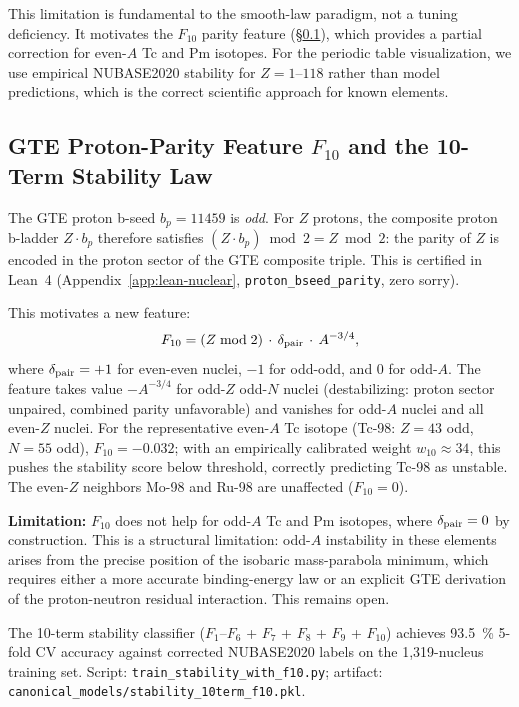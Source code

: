 \documentclass[9pt,twocolumn]{extarticle}
\begin{document}
This limitation is fundamental to the smooth-law paradigm, not a tuning deficiency. It motivates the $F_{10}$ parity feature (\S\ref{sec:f10-feature}), which provides a partial correction for even-$A$ Tc and Pm isotopes. For the periodic table visualization, we use empirical NUBASE2020 stability for $Z=1$--$118$ rather than model predictions, which is the correct scientific approach for known elements.

\subsection{GTE Proton-Parity Feature $F_{10}$ and the 10-Term Stability Law}
\label{sec:f10-feature}

The GTE proton b-seed $b_p = 11459$ is \emph{odd}. For $Z$ protons, the composite proton b-ladder $Z \cdot b_p$ therefore satisfies $(Z \cdot b_p)\bmod 2 = Z \bmod 2$: the parity of $Z$ is encoded in the proton sector of the GTE composite triple. This is certified in Lean~4 (Appendix~\ref{app:lean-nuclear}, \texttt{proton\_bseed\_parity}, zero sorry).

This motivates a new feature:
\begin{equation}
F_{10} = (Z \bmod 2)\,\cdot\,\delta_{\rm pair}\,\cdot\,A^{-3/4},
\end{equation}
where $\delta_{\rm pair} = +1$ for even-even nuclei, $-1$ for odd-odd, and $0$ for odd-$A$. The feature takes value $-A^{-3/4}$ for odd-$Z$ odd-$N$ nuclei (destabilizing: proton sector unpaired, combined parity unfavorable) and vanishes for odd-$A$ nuclei and all even-$Z$ nuclei. For the representative even-$A$ Tc isotope (Tc-98: $Z=43$ odd, $N=55$ odd), $F_{10} = -0.032$; with an empirically calibrated weight $w_{10} \approx 34$, this pushes the stability score below threshold, correctly predicting Tc-98 as unstable. The even-$Z$ neighbors Mo-98 and Ru-98 are unaffected ($F_{10}=0$).

\textbf{Limitation:} $F_{10}$ does not help for odd-$A$ Tc and Pm isotopes, where $\delta_{\rm pair}=0$ by construction. This is a structural limitation: odd-$A$ instability in these elements arises from the precise position of the isobaric mass-parabola minimum, which requires either a more accurate binding-energy law or an explicit GTE derivation of the proton-neutron residual interaction. This remains open.

The 10-term stability classifier ($F_1$--$F_6$ + $F_7$ + $F_8$ + $F_9$ + $F_{10}$) achieves \SI{93.5}{\percent} 5-fold CV accuracy against corrected NUBASE2020 labels on the 1,319-nucleus training set. Script: \texttt{train\_stability\_with\_f10.py}; artifact: \texttt{canonical\_models/stability\_10term\_f10.pkl}.
\end{document}
